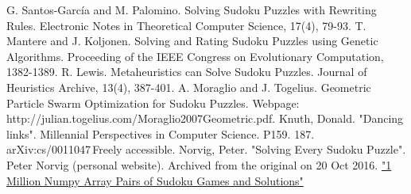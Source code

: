 \documentclass[12pt]{article}
\begin{document}
\begin{spacing}{1.1}
\begin{thebibliography}{}
	 G. Santos-García and M. Palomino. Solving Sudoku Puzzles with Rewriting Rules. Electronic Notes in Theoretical Computer Science, 17(4), 79-93.
	T. Mantere and J. Koljonen. Solving and Rating Sudoku Puzzles using Genetic Algorithms. Proceeding of the IEEE Congress on Evolutionary Computation, 1382-1389.
	R. Lewis. Metaheuristics can Solve Sudoku Puzzles. Journal of Heuristics Archive, 13(4), 387-401.
	A. Moraglio and J. Togelius. Geometric Particle Swarm Optimization for Sudoku Puzzles. Webpage: http://julian.togelius.com/Moraglio2007Geometric.pdf.
	Knuth, Donald. "Dancing links". Millennial Perspectives in Computer Science. P159. 187. arXiv:cs/0011047 Freely accessible.
	Norvig, Peter. "Solving Every Sudoku Puzzle". Peter Norvig (personal website). Archived from the original on 20 Oct 2016.
	\href{https://www.kaggle.com/bryanpark/sudoku}{"1 Million Numpy Array Pairs of Sudoku Games and Solutions"}
\end{thebibliography}

\end{spacing}
\end{document}
